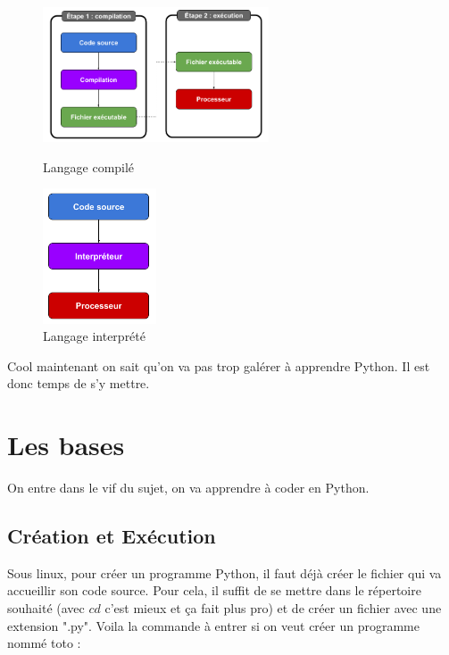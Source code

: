 \documentclass[a4paper,12pt]{article}
\begin{document}
\begin{figure}[h]
    \centering
    \begin{minipage}{0.45\textwidth}
        \centering
        \includegraphics[height=4cm]{../images/compile.png}
        \caption{Langage compilé}
    \end{minipage}
    \hfill
    \begin{minipage}{0.45\textwidth}
        \centering
        \includegraphics[height=4cm]{../images/interprete.png}
        \caption{Langage interprété}
    \end{minipage}
\end{figure}

Cool maintenant on sait qu'on va pas trop galérer à apprendre Python. Il est donc temps de s'y mettre.

\newpage

\section{Les bases}

On entre dans le vif du sujet, on va apprendre à coder en Python. 

\subsection{Création et Exécution}

Sous linux, pour créer un programme Python, il faut déjà créer le fichier qui va accueillir son code source. \newline
Pour cela, il suffit de se mettre dans le répertoire souhaité (avec $cd$ c'est mieux et ça fait plus pro) et de créer un fichier avec une extension ".py".
Voila la commande à entrer si on veut créer un programme nommé toto :
\end{document}
